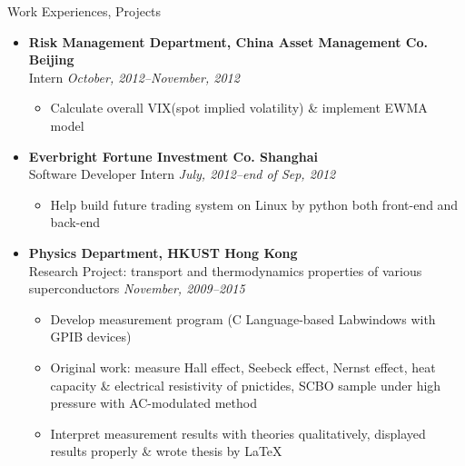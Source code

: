 \documentclass[a4paper,8pt,oneside]{scrartcl}
\newenvironment{ressection}[1]{
    \vspace{2pt}
    {\selectfont#1}
    \begin{itemize}
    \vspace{0pt}
}{
    \end{itemize}
}
\newcommand{\resitems}[1]{
    \vspace{-4pt}
    \item #1
}
\newcommand{\ressubitem}[1]{
    \vspace{0pt}
    \item #1
}
\newcommand{\resbigitem}[3]{
    \vspace{-5pt}
    \item
    \textbf{#1}\\
    #2
    \textit{#3}
}
\newenvironment{ressubsec}[3]{
    \resbigitem{#1}{#2}{#3}
    \vspace{-2pt}
    \begin{itemize}
}{
    \end{itemize}
}
\begin{document}
\begin{ressection}{Work Experiences, Projects}
    \begin{ressubsec}{Risk Management Department, China Asset Management Co. \hfill Beijing}{Intern}{\hfill October,
        2012--November, 2012} 
        \ressubitem{Calculate overall VIX(spot implied volatility) \& implement EWMA model}
    \end{ressubsec}
    \begin{ressubsec}{Everbright Fortune Investment Co. \hfill Shanghai}{Software Developer Intern}{\hfill July,
        2012--end of Sep, 2012}
      \ressubitem{Help build future trading system on Linux by python both front-end and back-end}
    \end{ressubsec}
    \begin{ressubsec}{Physics Department, HKUST \hfill Hong Kong}{Research Project: transport and thermodynamics properties of various superconductors}
      {\hfill November, 2009--2015}
      \ressubitem{Develop measurement program (C Language-based Labwindows with GPIB devices)}
      \ressubitem{Original work: measure Hall effect, Seebeck effect, Nernst effect, heat capacity \& electrical resistivity of pnictides, SCBO sample under high pressure with AC-modulated method}
      \ressubitem{Interpret measurement results with theories qualitatively, displayed results properly \& wrote thesis by \LaTeX{}}
    \end{ressubsec}
\end{ressection}

\end{document}
